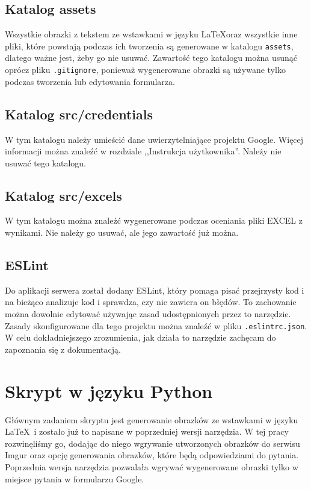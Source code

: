  
\subsection{Katalog assets}
Wszystkie obrazki z tekstem ze wstawkami w języku \LaTeX  oraz wszystkie inne pliki, które
powstają podczas ich tworzenia są generowane w katalogu \texttt{assets}, dlatego ważne jest, żeby
go nie usuwać. Zawartość tego katalogu można usunąć oprócz pliku \texttt{.gitignore}, ponieważ
wygenerowane obrazki są używane tylko podczas tworzenia lub edytowania formularza.

\subsection{Katalog src/credentials}
W tym katalogu należy umieścić dane uwierzytelniające projektu Google. Więcej informacji można
znaleźć w rozdziale ,,Instrukcja użytkownika''. Należy nie usuwać tego katalogu.

\subsection{Katalog src/excels}
W tym katalogu można znaleźć wygenerowane podczas oceniania pliki EXCEL z wynikami. Nie należy go
usuwać, ale jego zawartość już można.

\subsection{ESLint}
Do aplikacji serwera został dodany ESLint, który pomaga pisać przejrzysty kod i na bieżąco
analizuje kod i sprawdza, czy nie zawiera on błędów. To zachowanie można dowolnie edytować używając 
zasad udostępnionych przez to narzędzie. Zasady skonfigurowane dla tego projektu można znaleźć 
w pliku \texttt{.eslintrc.json}. W celu dokładniejszego zrozumienia, jak działa to narzędzie 
zachęcam do zapoznania się z dokumentacją.

\section{Skrypt w języku Python}

Głównym zadaniem skryptu jest generowanie obrazków ze wstawkami w języku \LaTeX \ i zostało
już to napisane w poprzedniej wersji narzędzia. W tej pracy rozwinęliśmy go, dodając do
niego wgrywanie utworzonych obrazków do serwisu Imgur oraz opcję generowania
obrazków, które będą odpowiedziami do pytania. Poprzednia wersja narzędzia pozwalała
wgrywać wygenerowane obrazki tylko w miejsce pytania w formularzu Google.

